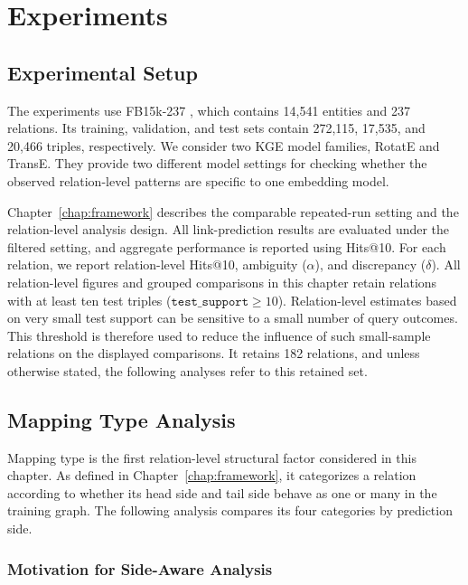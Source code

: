 \section{Experiments}
\label{chap:experiments}

\subsection{Experimental Setup}

The experiments use FB15k-237 \citep{toutanova2015observed}, which contains
14,541 entities and 237 relations. Its training, validation, and test sets
contain 272,115, 17,535, and 20,466 triples, respectively. We consider two KGE
model families, RotatE and TransE. They provide two different model settings
for checking whether the observed relation-level patterns are specific to one
embedding model.

Chapter~\ref{chap:framework} describes the comparable repeated-run setting and
the relation-level analysis design. All link-prediction results are evaluated
under the filtered setting, and
aggregate performance is reported using Hits@10. For each relation,
we report relation-level Hits@10, ambiguity ($\alpha$), and
discrepancy ($\delta$). All
relation-level figures and grouped comparisons in this chapter retain
relations with at least ten test triples
(\(\texttt{test\_support}\geq 10\)). Relation-level estimates based on very
small test support can be sensitive to a small number of query outcomes. This
threshold is therefore used to reduce the influence of such small-sample
relations on the displayed comparisons. It retains 182 relations, and unless
otherwise stated, the following analyses refer to this retained set.

\subsection{Mapping Type Analysis}
\label{sec:mapping_type_analysis}

Mapping type is the first relation-level structural factor considered in this
chapter. As defined in Chapter~\ref{chap:framework}, it categorizes a relation
according to whether its head side and tail side behave as one or many in the
training graph. The following analysis compares its four categories by
prediction side.

\subsubsection{Motivation for Side-Aware Analysis}

